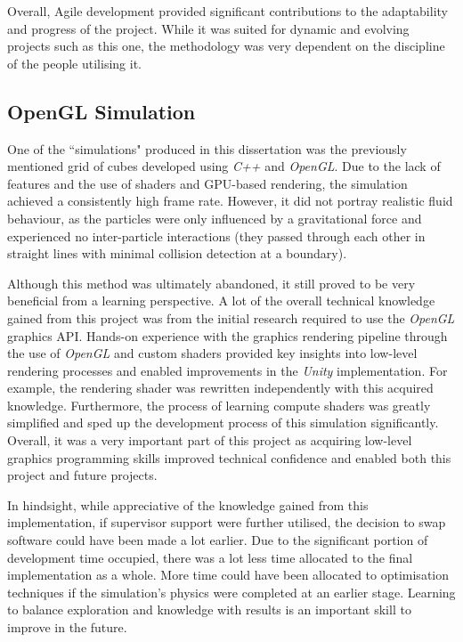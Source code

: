 \documentclass[12pt]{article}
\begin{document}
    Overall, Agile development provided significant contributions to the adaptability and progress of the project. While it was suited for dynamic and evolving projects such as this one, the methodology was very dependent on the discipline of the people utilising it.

    \subsection{OpenGL Simulation}

    One of the ``simulations" produced in this dissertation was the previously mentioned grid of cubes developed using \textit{C++} and \textit{OpenGL}. Due to the lack of features and the use of shaders and GPU-based rendering, the simulation achieved a consistently high frame rate. However, it did not portray realistic fluid behaviour, as the particles were only influenced by a gravitational force and experienced no inter-particle interactions (they passed through each other in straight lines with minimal collision detection at a boundary).

    Although this method was ultimately abandoned, it still proved to be very beneficial from a learning perspective. A lot of the overall technical knowledge gained from this project was from the initial research required to use the \textit{OpenGL} graphics API. Hands-on experience with the graphics rendering pipeline through the use of \textit{OpenGL} and custom shaders provided key insights into low-level rendering processes and enabled improvements in the \textit{Unity} implementation. For example, the rendering shader was rewritten independently with this acquired knowledge. Furthermore, the process of learning compute shaders was greatly simplified and sped up the development process of this simulation significantly. Overall, it was a very important part of this project as acquiring low-level graphics programming skills improved technical confidence and enabled both this project and future projects.

    In hindsight, while appreciative of the knowledge gained from this implementation, if supervisor support were further utilised, the decision to swap software could have been made a lot earlier. Due to the significant portion of development time occupied, there was a lot less time allocated to the final implementation as a whole. More time could have been allocated to optimisation techniques if the simulation's physics were completed at an earlier stage. Learning to balance exploration and knowledge with results is an important skill to improve in the future.
\end{document}

